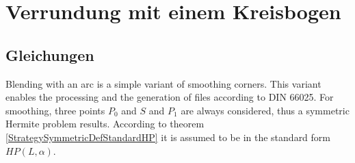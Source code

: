 %
%
%






\chapter{Verrundung mit einem Kreisbogen}


\section{Gleichungen}

Blending with an arc is a simple variant of smoothing corners. This variant enables the processing and the generation of files according to DIN 66025. For smoothing, three points $P_0$ and $S$ and $P_1$ are always considered, thus a symmetric Hermite problem results. According to theorem \ref{StrategySymmetricDefStandardHP} it is assumed to be in the standard form $HP(L,\alpha)$.
 
 \bigskip
 
 
 
